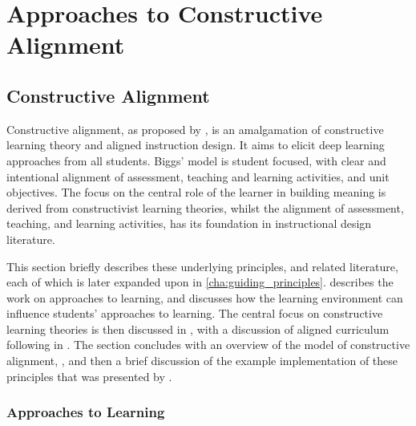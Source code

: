 
\chapter{Approaches to Constructive Alignment} %
\label{cha:background}

\graphicspath{{Figures/Background/}}




\section{Constructive Alignment} %
\label{sec:constructive_alignment}

Constructive alignment, as proposed by \citet{Biggs:1996c}, is an amalgamation of constructive learning theory and aligned instruction design. It aims to elicit deep learning approaches from all students. Biggs' model is student focused, with clear and intentional alignment of assessment, teaching and learning activities, and unit objectives. The focus on the central role of the learner in building meaning is derived from constructivist learning theories, whilst the alignment of assessment, teaching, and learning activities, has its foundation in instructional design literature. 

This section briefly describes these underlying principles, and related literature, each of which is later expanded upon in \cref{cha:guiding_principles}.  describes the work on approaches to learning, and discusses how the learning environment can influence students' approaches to learning. The central focus on constructive learning theories is then discussed in , with a discussion of aligned curriculum following in . The section concludes with an overview of the model of constructive alignment, , and then a brief discussion of the example implementation of these principles that was presented by \citet{Biggs:1996c}.

\subsection{Approaches to Learning} %
\label{sub:approaches_to_learning}

